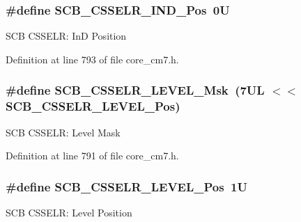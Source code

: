 \subsubsection[{\texorpdfstring{S\+C\+B\+\_\+\+C\+S\+S\+E\+L\+R\+\_\+\+I\+N\+D\+\_\+\+Pos}{SCB_CSSELR_IND_Pos}}]{\setlength{\rightskip}{0pt plus 5cm}\#define S\+C\+B\+\_\+\+C\+S\+S\+E\+L\+R\+\_\+\+I\+N\+D\+\_\+\+Pos~0U}\hypertarget{group___c_m_s_i_s___s_c_b_ga70e80783c3bd7b11504c63b052b0c0b9}{}\label{group___c_m_s_i_s___s_c_b_ga70e80783c3bd7b11504c63b052b0c0b9}
S\+CB C\+S\+S\+E\+LR\+: InD Position 

Definition at line 793 of file core\+\_\+cm7.\+h.

\subsubsection[{\texorpdfstring{S\+C\+B\+\_\+\+C\+S\+S\+E\+L\+R\+\_\+\+L\+E\+V\+E\+L\+\_\+\+Msk}{SCB_CSSELR_LEVEL_Msk}}]{\setlength{\rightskip}{0pt plus 5cm}\#define S\+C\+B\+\_\+\+C\+S\+S\+E\+L\+R\+\_\+\+L\+E\+V\+E\+L\+\_\+\+Msk~(7\+U\+L $<$$<$ S\+C\+B\+\_\+\+C\+S\+S\+E\+L\+R\+\_\+\+L\+E\+V\+E\+L\+\_\+\+Pos)}\hypertarget{group___c_m_s_i_s___s_c_b_gaa24e3a6d6960acff3d6949e416046cf0}{}\label{group___c_m_s_i_s___s_c_b_gaa24e3a6d6960acff3d6949e416046cf0}
S\+CB C\+S\+S\+E\+LR\+: Level Mask 

Definition at line 791 of file core\+\_\+cm7.\+h.

\subsubsection[{\texorpdfstring{S\+C\+B\+\_\+\+C\+S\+S\+E\+L\+R\+\_\+\+L\+E\+V\+E\+L\+\_\+\+Pos}{SCB_CSSELR_LEVEL_Pos}}]{\setlength{\rightskip}{0pt plus 5cm}\#define S\+C\+B\+\_\+\+C\+S\+S\+E\+L\+R\+\_\+\+L\+E\+V\+E\+L\+\_\+\+Pos~1U}\hypertarget{group___c_m_s_i_s___s_c_b_ga8c014c9678bc9072f10459a1e14b973c}{}\label{group___c_m_s_i_s___s_c_b_ga8c014c9678bc9072f10459a1e14b973c}
S\+CB C\+S\+S\+E\+LR\+: Level Position 

